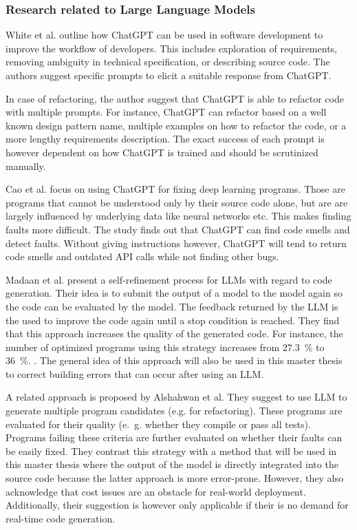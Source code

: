 \subsubsection{Research related to Large Language Models}

White et al. \cite{White2023ChatGPTPP} outline how ChatGPT can be used in software development to improve the workflow of developers. This includes  exploration of requirements, removing ambiguity in technical specification, or describing source code. The authors suggest specific prompts to elicit a suitable response from ChatGPT.

In case of refactoring, the author suggest that ChatGPT is able to refactor code with multiple prompts. For instance, ChatGPT can refactor based on a well known design pattern name, multiple examples on how to refactor the code, or a more lengthy requirements description. The exact success of each prompt is however dependent on how ChatGPT is trained and should be scrutinized manually. 

Cao et al. \cite{cao2023study} focus on using ChatGPT for fixing deep learning programs. Those are programs that cannot be understood only by their source code alone, but are are largely influenced by underlying data like  neural networks etc. This makes finding faults more difficult. The study finds out that ChatGPT can find code smells and detect faults. Without giving instructions however, ChatGPT will tend to return code smells and outdated API calls while not finding other bugs. 


Madaan et al. present a self-refinement process for \acp{LLM} with regard to code generation. Their idea is to submit the output of a model to the model again so the code can be evaluated by the model. The feedback returned by the \ac{LLM} is the used to improve the code again until a stop condition is reached. They find that this approach increases the quality of the generated code. For instance, the number of optimized programs using this strategy increases from 27.3~\% to 36~\%. \cite{Madaan2023SelfRefineIR}. 
The general idea of this approach will also be used in this master thesis to correct building errors that can occur after using an \ac{LLM}. 

A related approach is proposed by Alshahwan et al. They suggest to use \ac{LLM} to generate multiple program candidates (e.g. for refactoring). These programs are evaluated for their quality (e.~g. whether they compile or pass all tests). Programs failing these criteria are further evaluated on whether their faults can be easily fixed. They contrast this strategy with a method that will be used in this master thesis where the output of the model is directly integrated into the source code because the latter approach is more error-prone. However, they also acknowledge that cost issues are an obstacle for real-world deployment.
Additionally, their suggestion is however only applicable if their is no demand for real-time code generation. \cite{alshahwan2024assuredllmbasedsoftwareengineering}
